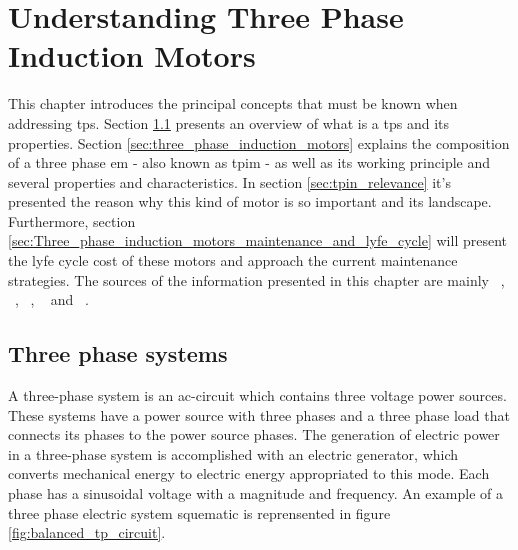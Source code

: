 \chapter{Understanding Three Phase Induction Motors}
\label{cha:users_manual}



This chapter introduces the principal concepts that must be known when addressing \acrfull{tps}. Section \ref{sec:three_phase_systems} presents an overview of what is a \acrshort{tps} and its properties. Section \ref{sec:three_phase_induction_motors} explains the composition of a three phase \acrfull{em} - also known as \acrfull{tpim} - as well as its working principle and several properties and characteristics. In section \ref{sec:tpin_relevance} it's presented the reason why this kind of motor is so important and its landscape. Furthermore, section \ref{sec:Three_phase_induction_motors_maintenance_and_lyfe_cycle} will present the lyfe cycle cost of these motors and approach the current maintenance strategies. The sources of the information presented in this chapter are mainly ~\cite{Helfenstein2000}, ~\cite{Alves2003}, ~\cite{Fitzgerald1985}, ~\cite{Guru2001} and ~\cite{Rashid2011}.

\section{Three phase systems} %
\label{sec:three_phase_systems}

A three-phase system is an \acrshort{ac}-circuit which contains three voltage power sources. These systems have a power source with three phases and a three phase load that connects its phases to the power source phases. The generation of electric power in a three-phase system is accomplished with an electric generator, which converts mechanical energy to electric energy appropriated to this mode. Each phase has a sinusoidal voltage with a magnitude and frequency. An example of a three phase electric system squematic is reprensented in figure \ref{fig:balanced_tp_circuit}.

